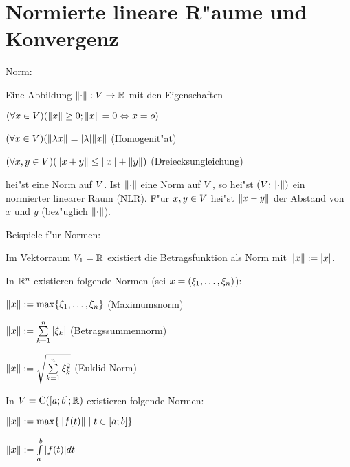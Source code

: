 \section{Normierte lineare R"aume und Konvergenz}
 Norm:{
  Eine Abbildung ${\left\| \cdot\right\|}:V\to\mathbb R$ mit den Eigenschaften
  \begin{stmts}
    \item 
      $(\forall x\in V)({\left\| x\right\|} \geq 0;{\left\| x\right\|} = 0 \Leftrightarrow x = o)$
    \item
      $(\forall x\in V)({\left\| \lambda x\right\|} = |\lambda| {\left\| x\right\|}$
      (Homogenit"at)
    \item
      $(\forall x,y\in V)({\left\| x+y\right\|} \leq {\left\| x\right\|}+{\left\| y\right\|})$
      (Dreiecksungleichung)
    \end{stmts}
  hei"st eine Norm auf $V$. Ist ${\left\| \cdot\right\|}$ eine Norm auf $V$, so hei"st
  $(V;{\left\| \cdot\right\|})$ ein normierter linearer Raum (NLR). F"ur $x,y\in V$
  hei"st ${\left\| x-y\right\|}$ der Abstand von $x$ und $y$ (bez"uglich ${\left\| \cdot\right\|}$).
  }
\example Beispiele f"ur Normen:{
  Im Vektorraum $V_1=\mathbb R$ existiert die Betragsfunktion als Norm mit 
  ${\left\| x\right\|}:=|x|$.
  
  In $\mathbb R^n$ existieren folgende Normen (sei $x=(\xi_1,\ldots,\xi_n)$):
  \begin{stmts}
    \item ${\left\| x\right\|}:= \max \{ \xi_1,\ldots,\xi_n \}$ (Maximumsnorm)
    \item $\norm x:= \sum_{k=1}^n |\xi_k|$ (Betragssummennorm)
    \item $\norm x:= \sqrt{\sum_{k=1}^n \xi_k^2}$ (Euklid-Norm)
    \end{stmts}
  
  In $V={\rm C}([a;b];\mathbb R)$ existieren folgende Normen:
  \begin{stmts}
    \item ${\left\| x\right\|}:= \max \{ {\left\| f(t)\right\|}\mid t\in [a;b] \}$ 
    \item $\norm x:= \int_a^b |f(t)| dt$ 
    \end{stmts}
  }
